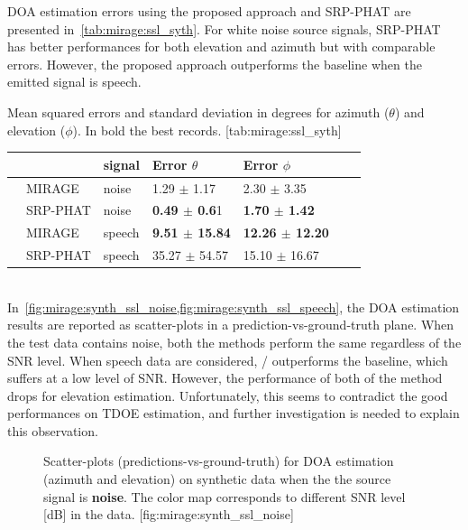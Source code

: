 \ac{DOA} estimation errors using the proposed approach and \ac{SRP-PHAT} are presented in~\cref{tab:mirage:ssl_syth}.
For white noise source signals, \ac{SRP-PHAT} has better performances for both elevation and azimuth but with comparable errors.
However, the proposed approach outperforms the baseline when the emitted signal is speech.
\begin{table}[h]
    \begin{sidecaption}[]{
        Mean squared errors and standard deviation in degrees for azimuth ($\theta$) and elevation ($\phi$). In bold the best records.
    }[tab:mirage:ssl_syth]
    \centering
    \small
    \begin{tabular*}{\linewidth}{@{\extracolsep{\fill}}lllllll@{}}
        \toprule
        & &  signal &  Error $\theta$  &  Error $\phi$ \\
        \midrule
        & MIRAGE &   noise &  1.29 $\pm$   1.17 &   2.30 $\pm$   3.35 \\
        & SRP-PHAT &   noise &  \textbf{0.49 $\pm$   0.6}1 &   \textbf{1.70 $\pm$   1.42} \\
        \midrule
        & MIRAGE &  speech & \textbf{ 9.51 $\pm$ 15.84} &  \textbf{12.26  $\pm$  12.20} \\
        & SRP-PHAT &  speech & 35.27 $\pm$  54.57 &  15.10 $\pm$  16.67 \\
        \bottomrule
    \end{tabular*}
    \end{sidecaption}
\end{table}
\\In~\cref{fig:mirage:synth_ssl_noise,fig:mirage:synth_ssl_speech}, the \ac{DOA} estimation results are reported as scatter-plots in a prediction-vs-ground-truth plane.
When the test data contains noise, both the methods perform the same regardless of the \ac{SNR} level.
When speech data are considered, \MIRAGE/ outperforms the baseline, which suffers at a low level of \ac{SNR}.
However, the performance of both of the method drops for elevation estimation.
Unfortunately, this seems to contradict the good performances on \ac{TDOE} estimation, and further investigation is needed to explain this observation.

\begin{figure}[h]
    \begin{sidecaption}[]{
        Scatter-plots (predictions-vs-ground-truth) for DOA estimation (azimuth and elevation) on synthetic data when the the source signal is \textbf{noise}.
        The color map corresponds to different SNR level [dB] in the data.
    }[fig:mirage:synth_ssl_noise]
    \centering
    \hfill
    \end{sidecaption}
\end{figure}

